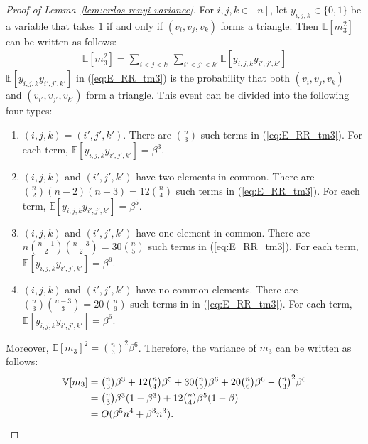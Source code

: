{\begin{proof}[Proof of Lemma~\ref{lem:erdos-renyi-variance}]
For $i,j,k \in [n]$, let $y_{i,j,k} \in \{0,1\}$ be a variable that takes $1$ if and only if 
$(v_i, v_j, v_k)$ forms a triangle. 
Then $\mathbb{E}[m_3^2]$ can be written as follows:
\begin{align}
  \mathbb{E}[m_3^2] = \sum_{i<j<k} ~ \sum_{i'<j'<k'}
  \mathbb{E}[y_{i,j,k} y_{i',j',k'}] 
  \label{eq:E_RR_tm3}
\end{align}
$\mathbb{E}[y_{i,j,k} y_{i',j',k'}]$ in (\ref{eq:E_RR_tm3}) is the probability that both $(v_i,v_j,v_k)$ and $(v_{i'},v_{j'},v_{k'})$ form a triangle. 
This event can be divided into the following four types:
\begin{enumerate}
\item $(i,j,k)=(i',j',k')$. There are $\binom{n}{3}$ such terms in (\ref{eq:E_RR_tm3}). 
For each term, $\mathbb{E}[y_{i,j,k} y_{i',j',k'}] = \beta^3$.
\item $(i,j,k)$ and $(i',j',k')$ have two elements in common. 
There are $\binom{n}{2} (n-2) (n-3) = 12\binom{n}{4}$ such terms in (\ref{eq:E_RR_tm3}). 
For each term, $\mathbb{E}[y_{i,j,k} y_{i',j',k'}] = \beta^5$. 
\item $(i,j,k)$ and $(i',j',k')$ have one element in common. 
There are $n \binom{n-1}{2} \binom{n-3}{2} = 30\binom{n}{5}$ such terms in (\ref{eq:E_RR_tm3}). 
For each term, $\mathbb{E}[y_{i,j,k} y_{i',j',k'}] = \beta^6$. 
\item $(i,j,k)$ and $(i',j',k')$ have no common elements. 
There are $\binom{n}{3} \binom{n-3}{3} = 20\binom{n}{6}$ such terms in in (\ref{eq:E_RR_tm3}). 
For each term, $\mathbb{E}[y_{i,j,k} y_{i',j',k'}] = \beta^6$. 
\end{enumerate}
Moreover, $\mathbb{E}[m_3]^2 = \binom{n}{3}^2 \beta^6$. 
Therefore, the variance of $m_3$ can be written as follows:
\begin{align*}
    \mathbb{V}[m_3] 
    &= \textstyle{\binom{n}{3} \beta^3 + 12\binom{n}{4} \beta^5 + 30\binom{n}{5} \beta^6 + 20\binom{n}{6} \beta^6 - \binom{n}{3}^2 \beta^6} \\
    &= \textstyle{\binom{n}{3} \beta^3 (1-\beta^3) + 12\binom{n}{4}\beta^5(1-\beta)} \\
    &= O(\beta^5 n^4 + \beta^3 n^3).
\end{align*}


\end{proof}}
